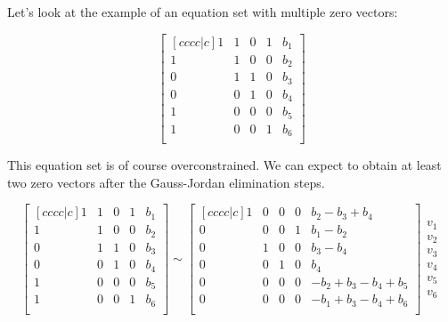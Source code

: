 Let's look at the example of an equation set with multiple zero vectors:

\begin{equation}
\begin{bmatrix}[cccc|c]
    1 & 1 & 0 & 1 & b_1 \\
    1 & 1 & 0 & 0 & b_2 \\
    0 & 1 & 1 & 0 & b_3 \\ 
    0 & 0 & 1 & 0 & b_4 \\ 
    1 & 0 & 0 & 0 & b_5 \\ 
    1 & 0 & 0 & 1 & b_6 \\ 
\end{bmatrix}
\end{equation}

This equation set is of course overconstrained.
We can expect to obtain at least two zero vectors after the Gauss-Jordan elimination steps.

\begin{equation}
\begin{bmatrix}[cccc|c]
    1 & 1 & 0 & 1 & b_1 \\
    1 & 1 & 0 & 0 & b_2 \\
    0 & 1 & 1 & 0 & b_3 \\ 
    0 & 0 & 1 & 0 & b_4 \\ 
    1 & 0 & 0 & 0 & b_5 \\ 
    1 & 0 & 0 & 1 & b_6 \\ 
\end{bmatrix} \sim
\begin{bmatrix}[cccc|c]
    1 & 0 & 0 & 0 & b_2 - b_3 + b_4 \\
    0 & 0 & 0 & 1 & b_1 - b_2 \\
    0 & 1 & 0 & 0 & b_3 - b_4 \\ 
    0 & 0 & 1 & 0 & b_4 \\ 
    0 & 0 & 0 & 0 & -b_2 + b_3 - b_4 + b_5 \\ 
    0 & 0 & 0 & 0 & -b_1 + b_3 - b_4 + b_6 \\ 
\end{bmatrix}
\begin{matrix}
v_1 \\ v_2 \\ v_3 \\ v_4 \\ v_5 \\ v_6
\end{matrix}
\label{eq:gauss_jordan1}
\end{equation}


